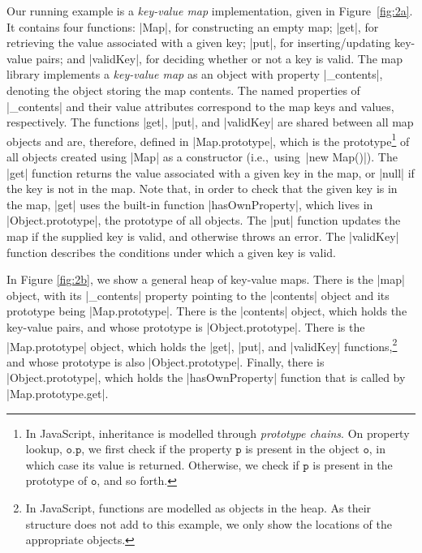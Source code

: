 Our running example is a \emph{key-value map} implementation, given in Figure~\ref{fig:2a}. It contains four functions: 
\jsinline|Map|, for constructing an empty map;
\jsinline|get|, for retrieving the value associated with a given key;
\jsinline|put|, for inserting/updating key-value pairs; and \jsinline|validKey|, for deciding whether or not a key is valid.
The map library implements a \emph{key-value map} as an object with property \jsinline|_contents|, denoting the object storing the map contents.  
The named properties of \jsinline|_contents| and their value attributes correspond to the map keys and values, respectively.
The functions \jsinline|get|, \jsinline|put|, and \jsinline|validKey| are shared between all map 
objects and are, therefore, defined in \jsinline|Map.prototype|, which is the prototype\footnote{In JavaScript, inheritance is modelled through \emph{prototype chains}. On property lookup, $\mathtt{o.p}$, we first check if the property $\mathtt{p}$ is present in the object $\mathtt{o}$, in which case its value is returned. Otherwise, we  check if $\mathtt{p}$ is present in the prototype of $\mathtt{o}$, and so  forth.} of all objects created using \jsinline|Map| as a constructor (i.e.,~using~\jsinline|new Map()|). 
The \jsinline|get| function returns the value associated with a given key in the map, or \jsinline|null| if the key is not in the map. 
Note that, in order to check that the given key is in the map, \jsinline|get| uses the built-in function \jsinline|hasOwnProperty|, which lives in \jsinline|Object.prototype|, the prototype of all objects.
The \jsinline|put| function updates the map if the supplied key is valid, and otherwise throws an error. 
The \jsinline|validKey| function describes the conditions under which a given key is valid. 

In Figure \ref{fig:2b}, we show a general heap of key-value maps. There is the \jsinline|map| object, with its \jsinline|_contents| property pointing to the \jsinline|contents| object and its prototype being \jsinline|Map.prototype|. There is the \jsinline|contents| object, which holds the key-value pairs, and whose prototype is \jsinline|Object.prototype|. There is the \jsinline|Map.prototype| object, which holds the \jsinline|get|, \jsinline|put|, and \jsinline|validKey| functions,\footnote{In JavaScript, functions are modelled as objects in the heap. As their structure does not add to this example, we only show the locations of the appropriate objects.} and whose prototype is also \jsinline|Object.prototype|. Finally, there is \jsinline|Object.prototype|, which holds the \jsinline|hasOwnProperty| function that is called by \jsinline|Map.prototype.get|.

